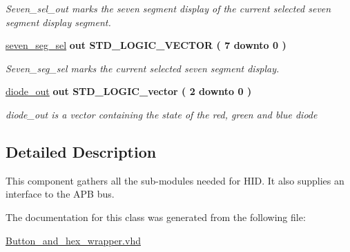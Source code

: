\begin{DoxyCompactItemize}
\begin{DoxyCompactList}\small\item\em Seven\-\_\-sel\-\_\-out marks the seven segment display of the current selected seven segment display segment. \end{DoxyCompactList}\item 
\hypertarget{classbutton__and__hex__wrapper_ae1646bd2ce2b0e1d1bb85bf2a88d1b5f}{\hyperlink{classbutton__and__hex__wrapper_ae1646bd2ce2b0e1d1bb85bf2a88d1b5f}{seven\-\_\-seg\-\_\-sel}  {\bfseries {\bfseries \textcolor{vhdlkeyword}{out}\textcolor{vhdlchar}{ }}} {\bfseries \textcolor{comment}{S\-T\-D\-\_\-\-L\-O\-G\-I\-C\-\_\-\-V\-E\-C\-T\-O\-R}\textcolor{vhdlchar}{ }\textcolor{vhdlchar}{(}\textcolor{vhdlchar}{ }\textcolor{vhdlchar}{ } \textcolor{vhdldigit}{7} \textcolor{vhdlchar}{ }\textcolor{vhdlchar}{ }\textcolor{vhdlchar}{ }\textcolor{vhdlkeyword}{downto}\textcolor{vhdlchar}{ }\textcolor{vhdlchar}{ }\textcolor{vhdlchar}{ } \textcolor{vhdldigit}{0} \textcolor{vhdlchar}{ }\textcolor{vhdlchar}{)}\textcolor{vhdlchar}{ }} }\label{classbutton__and__hex__wrapper_ae1646bd2ce2b0e1d1bb85bf2a88d1b5f}

\begin{DoxyCompactList}\small\item\em Seven\-\_\-seg\-\_\-sel marks the current selected seven segment display. \end{DoxyCompactList}\item 
\hypertarget{classbutton__and__hex__wrapper_a7691db71e3330cb4b875bb27e8fbb8c7}{\hyperlink{classbutton__and__hex__wrapper_a7691db71e3330cb4b875bb27e8fbb8c7}{diode\-\_\-out}  {\bfseries {\bfseries \textcolor{vhdlkeyword}{out}\textcolor{vhdlchar}{ }}} {\bfseries \textcolor{comment}{S\-T\-D\-\_\-\-L\-O\-G\-I\-C\-\_\-vector}\textcolor{vhdlchar}{ }\textcolor{vhdlchar}{(}\textcolor{vhdlchar}{ }\textcolor{vhdlchar}{ } \textcolor{vhdldigit}{2} \textcolor{vhdlchar}{ }\textcolor{vhdlchar}{ }\textcolor{vhdlchar}{ }\textcolor{vhdlkeyword}{downto}\textcolor{vhdlchar}{ }\textcolor{vhdlchar}{ }\textcolor{vhdlchar}{ } \textcolor{vhdldigit}{0} \textcolor{vhdlchar}{ }\textcolor{vhdlchar}{)}\textcolor{vhdlchar}{ }} }\label{classbutton__and__hex__wrapper_a7691db71e3330cb4b875bb27e8fbb8c7}

\begin{DoxyCompactList}\small\item\em diode\-\_\-out is a vector containing the state of the red, green and blue diode \end{DoxyCompactList}\end{DoxyCompactItemize}


\subsection{Detailed Description}
This component gathers all the sub-\/modules needed for H\-I\-D. It also supplies an interface to the A\-P\-B bus. 

The documentation for this class was generated from the following file\-:\begin{DoxyCompactItemize}
\item 
\hyperlink{Button__and__hex__wrapper_8vhd}{Button\-\_\-and\-\_\-hex\-\_\-wrapper.\-vhd}\end{DoxyCompactItemize}

